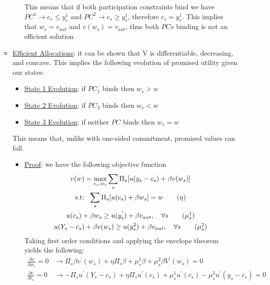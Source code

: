 \documentclass{article}
\begin{document}
\begin{itemize}
\begin{itemize}
\begin{itemize}
            This means that if both participation constraints bind we have $PC^{1} \rightarrow c_{s} \leq y_{s}^{1}$ and $PC^{2} \rightarrow c_{s} \geq y_{s}^{1}$, therefore $c_{s} = y_{s}^{1}$. This implies that $w_{s} = v_{aut}$ and $v(w_{s}) = v_{aut}$, thus both $PCs$ binding is not an efficient solution
        \end{itemize}
        \item \underline{Efficient Allocations}: it can be shown that V is differentiable, decreasing, and concave. This implies the following evolution of promised utility given our states:
        \begin{itemize}
            \item  \underline{State 1 Evolution}: if $PC_{1}$ binds then $w_{s} > w$
            \item  \underline{State 2 Evolution}: if $PC_{2}$ binds then $w_{s} < w$
            \item  \underline{State 3 Evolution}: if neither $PC$ binds then $w_{s} = w$
        \end{itemize}
        This means that, unlike with one-sided commitment, promised values can fall.
        \begin{itemize}
            \item  \underline{Proof}: we have the following objective function
            \begin{gather*}
                v(w) = \max_{c_{s}, w_{s}} \sum_{s} \Pi_{s} [u(y_{s} - c_{s}) + \beta v(w_{s})] \\
                \text{s.t:} \ \ \sum_{s} \Pi_{s}[u(c_{s}) + \beta w_{s}] = w \tag{$\eta$} \\
                u(c_{s}) + \beta w_{s} \geq u(y_{s}^{'}) + \beta v_{aut}, \ \ \ \forall s \tag{$\mu_{s}^{1}$} \\
                u(Y_{s} - c_{s}) + \beta v(w_{s}) \geq u(y_{s}^{2}) + \beta v_{aut}, \ \ \ \forall s \tag{$\mu_{s}^{2}$} \\
            \end{gather*}
            Taking first order conditions and applying the envelope theorem yields the following:
            \begin{align*}
             \frac{\partial v}{\partial w_{s}} = 0 &\rightarrow \Pi_{s} \beta v^{'}(w_{s}) + \eta \Pi_{s} \beta + \mu_{s}^{1} \beta + \mu_{s}^{2} \beta V^{'}(w_{s}) = 0 \tag{1} \\
             \frac{\partial v}{\partial c_{s}} = 0 &\rightarrow - \Pi_{s}u^{'}(Y_{s} - c_{s}) + \eta \Pi_{s}u^{'}(c_{s}) + \mu_{s}^{1}u^{'}(c_{s}) - \mu_{s}^{2} u^{'}(y_{s} - c_{s}) = 0 \tag{2} \\

\end{align*}
\end{itemize}
\end{itemize}
\end{itemize}
\end{document}

